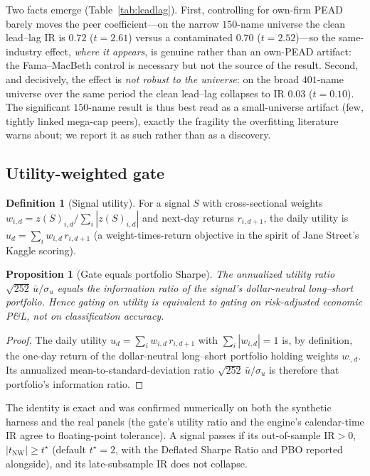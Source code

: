 \documentclass[11pt,a4paper]{article}
\theoremstyle{plain}
\newtheorem{proposition}[theorem]{Proposition}
\theoremstyle{definition}
\newtheorem{definition}[theorem]{Definition}
\newcommand{\IR}{\mathrm{IR}}
\begin{document}
Two facts emerge (Table~\ref{tab:leadlag}). First, controlling for own-firm PEAD barely moves the
peer coefficient---on the narrow $150$-name universe the clean lead--lag IR is $0.72$ ($t=2.61$)
versus a contaminated $0.70$ ($t=2.52$)---so the same-industry effect, \emph{where it appears}, is
genuine rather than an own-PEAD artifact: the Fama--MacBeth control is necessary but not the source
of the result. Second, and decisively, the effect is \emph{not robust to the universe}: on the broad
$401$-name universe over the same period the clean lead--lag collapses to IR $0.03$ ($t=0.10$). The
significant $150$-name result is thus best read as a small-universe artifact (few, tightly linked
mega-cap peers), exactly the fragility the overfitting literature warns about; we report it as such
rather than as a discovery.

\subsection{Utility-weighted gate}
\begin{definition}[Signal utility]\label{def:util}
For a signal $S$ with cross-sectional weights $w_{i,d}=z(S)_{i,d}/\sum_i|z(S)_{i,d}|$ and next-day
returns $r_{i,d+1}$, the daily utility is $u_d=\sum_i w_{i,d}\,r_{i,d+1}$ (a weight-times-return
objective in the spirit of Jane Street's Kaggle scoring).
\end{definition}
\begin{proposition}[Gate equals portfolio Sharpe]\label{prop:gate}
The annualized utility ratio $\sqrt{252}\,\bar u/\sigma_u$ equals the information ratio of the
signal's dollar-neutral long--short portfolio. Hence gating on utility is equivalent to gating on
risk-adjusted economic P\&L, not on classification accuracy.
\end{proposition}
\begin{proof}
The daily utility $u_d=\sum_i w_{i,d}\,r_{i,d+1}$ with $\sum_i|w_{i,d}|=1$ is, by definition, the
one-day return of the dollar-neutral long--short portfolio holding weights $w_{\cdot,d}$. Its
annualized mean-to-standard-deviation ratio $\sqrt{252}\,\bar u/\sigma_u$ is therefore that
portfolio's information ratio. \qedhere
\end{proof}
\noindent The identity is exact and was confirmed numerically on both the synthetic harness and the
real panels (the gate's utility ratio and the engine's calendar-time IR agree to floating-point
tolerance).
A signal passes if its out-of-sample $\IR>0$, $|t_{\mathrm{NW}}|\ge t^\star$ (default $t^\star=2$,
with the Deflated Sharpe Ratio and PBO reported alongside), and its late-subsample $\IR$ does not
collapse.
\end{document}
